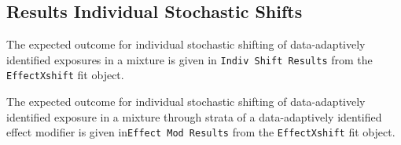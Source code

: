 \documentclass[
]{article}
\newenvironment{Shaded}{\begin{snugshade}}{\end{snugshade}}
\newcommand{\AttributeTok}[1]{\textcolor[rgb]{0.77,0.63,0.00}{#1}}
\newcommand{\FunctionTok}[1]{\textcolor[rgb]{0.00,0.00,0.00}{#1}}
\newcommand{\NormalTok}[1]{#1}
\newcommand{\OtherTok}[1]{\textcolor[rgb]{0.56,0.35,0.01}{#1}}
\newcommand{\SpecialCharTok}[1]{\textcolor[rgb]{0.00,0.00,0.00}{#1}}
\newcommand{\StringTok}[1]{\textcolor[rgb]{0.31,0.60,0.02}{#1}}
\begin{document}
\hypertarget{results-individual-stochastic-shifts}{%
\subsection{Results Individual Stochastic
Shifts}\label{results-individual-stochastic-shifts}}

The expected outcome for individual stochastic shifting of
data-adaptively identified exposures in a mixture is given in
\texttt{Indiv\ Shift\ Results} from the \texttt{EffectXshift} fit object.

\begin{Shaded}
\end{Shaded}

The expected outcome for individual stochastic shifting of
data-adaptively identified exposure in a mixture through strata of a
data-adaptively identified effect modifier is given
in\texttt{Effect\ Mod\ Results} from the \texttt{EffectXshift} fit object.

\begin{Shaded}
\end{Shaded}
\end{document}
